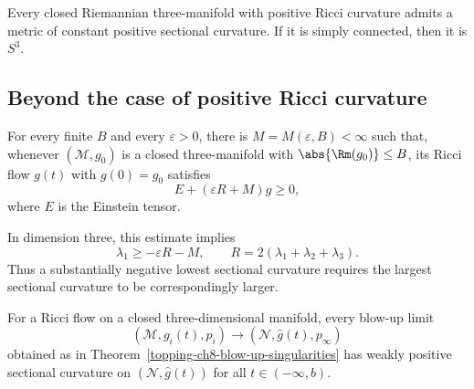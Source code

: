\begin{corollary}
\label{topping-ch10-space-form-corollary}
Every closed Riemannian three-manifold with positive Ricci curvature admits a
metric of constant positive sectional curvature. If it is simply connected,
then it is $S^3$.
\end{corollary}

\subsection{Beyond the case of positive Ricci curvature}

\begin{theorem}
\label{topping-ch10-hamilton-ivey-theorem}
For every finite $B$ and every $\varepsilon>0$, there is
$M=M(\varepsilon,B)<\infty$ such that, whenever
$(\mathcal{M},g_0)$ is a closed three-manifold with
$\abs{\Rm(g_0)}\leq B$, its Ricci flow $g(t)$ with $g(0)=g_0$ satisfies
\[
E+(\varepsilon R+M)g\geq0,
\]
where $E$ is the Einstein tensor.
\end{theorem}

In dimension three, this estimate implies
\[
\lambda_1\geq-\varepsilon R-M,
\qquad
R=2(\lambda_1+\lambda_2+\lambda_3).
\]
Thus a substantially negative lowest sectional curvature requires the largest
sectional curvature to be correspondingly larger.

\begin{corollary}
\label{topping-ch10-blowup-weakly-positive}
For a Ricci flow on a closed three-dimensional manifold, every blow-up limit
\[
(\mathcal{M},g_i(t),p_i)\longrightarrow(\mathcal{N},\hat g(t),p_\infty)
\]
obtained as in Theorem~\ref{topping-ch8-blow-up-singularities} has weakly positive sectional curvature on
$(\mathcal{N},\hat g(t))$ for all $t\in(-\infty,b)$.
\end{corollary}
